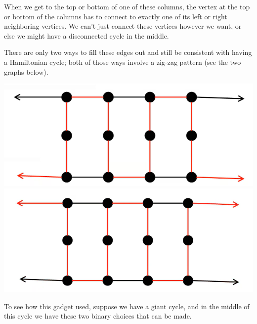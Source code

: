 \documentclass[letterpaper]{article}
\begin{document}
\begin{itemize}
    When we get to the top or bottom of one of these columns, the vertex at the top or bottom of the columns has to connect to exactly one of its left or right neighboring vertices. We can't just connect these vertices however we want, or else we might have a disconnected cycle in the middle. 

    \bigskip 

    There are only two ways to fill these edges out and still be consistent with having a Hamiltonian cycle; both of those ways involve a zig-zag pattern (see the two graphs below). 
    \begin{center}
        \includegraphics[scale=0.3]{../assets/zoe_ham_5.png}
        \includegraphics[scale=0.3]{../assets/zoe_ham_6.png}
    \end{center}
    To see how this gadget used, suppose we have a giant cycle, and in the middle of this cycle we have these two binary choices that can be made. 
    \begin{center}

\end{center}
\end{itemize}
\end{document}
